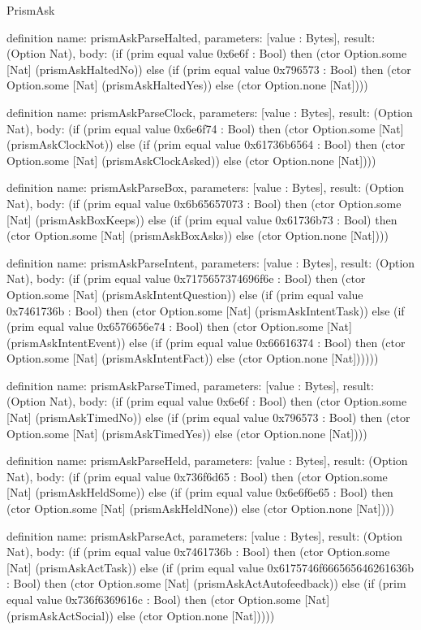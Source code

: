 \begin{lexlean}{PrismAsk}
\begin{semanticmodule}
definition{
  name: prismAskParseHalted,
  parameters: [value : Bytes],
  result: (Option Nat),
  body: (if (prim equal value 0x6e6f : Bool) then (ctor Option.some [Nat] (prismAskHaltedNo)) else (if (prim equal value 0x796573 : Bool) then (ctor Option.some [Nat] (prismAskHaltedYes)) else (ctor Option.none [Nat])))
}

definition{
  name: prismAskParseClock,
  parameters: [value : Bytes],
  result: (Option Nat),
  body: (if (prim equal value 0x6e6f74 : Bool) then (ctor Option.some [Nat] (prismAskClockNot)) else (if (prim equal value 0x61736b6564 : Bool) then (ctor Option.some [Nat] (prismAskClockAsked)) else (ctor Option.none [Nat])))
}

definition{
  name: prismAskParseBox,
  parameters: [value : Bytes],
  result: (Option Nat),
  body: (if (prim equal value 0x6b65657073 : Bool) then (ctor Option.some [Nat] (prismAskBoxKeeps)) else (if (prim equal value 0x61736b73 : Bool) then (ctor Option.some [Nat] (prismAskBoxAsks)) else (ctor Option.none [Nat])))
}

definition{
  name: prismAskParseIntent,
  parameters: [value : Bytes],
  result: (Option Nat),
  body: (if (prim equal value 0x7175657374696f6e : Bool) then (ctor Option.some [Nat] (prismAskIntentQuestion)) else (if (prim equal value 0x7461736b : Bool) then (ctor Option.some [Nat] (prismAskIntentTask)) else (if (prim equal value 0x6576656e74 : Bool) then (ctor Option.some [Nat] (prismAskIntentEvent)) else (if (prim equal value 0x66616374 : Bool) then (ctor Option.some [Nat] (prismAskIntentFact)) else (ctor Option.none [Nat])))))
}

definition{
  name: prismAskParseTimed,
  parameters: [value : Bytes],
  result: (Option Nat),
  body: (if (prim equal value 0x6e6f : Bool) then (ctor Option.some [Nat] (prismAskTimedNo)) else (if (prim equal value 0x796573 : Bool) then (ctor Option.some [Nat] (prismAskTimedYes)) else (ctor Option.none [Nat])))
}

definition{
  name: prismAskParseHeld,
  parameters: [value : Bytes],
  result: (Option Nat),
  body: (if (prim equal value 0x736f6d65 : Bool) then (ctor Option.some [Nat] (prismAskHeldSome)) else (if (prim equal value 0x6e6f6e65 : Bool) then (ctor Option.some [Nat] (prismAskHeldNone)) else (ctor Option.none [Nat])))
}

definition{
  name: prismAskParseAct,
  parameters: [value : Bytes],
  result: (Option Nat),
  body: (if (prim equal value 0x7461736b : Bool) then (ctor Option.some [Nat] (prismAskActTask)) else (if (prim equal value 0x6175746f666565646261636b : Bool) then (ctor Option.some [Nat] (prismAskActAutofeedback)) else (if (prim equal value 0x736f6369616c : Bool) then (ctor Option.some [Nat] (prismAskActSocial)) else (ctor Option.none [Nat]))))
}


\end{semanticmodule}
\end{lexlean}
